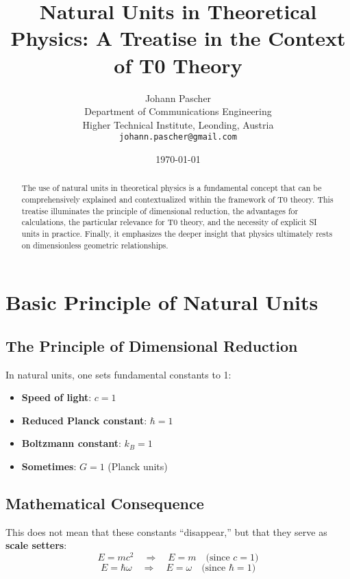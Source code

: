 \documentclass[12pt,a4paper]{article}
\title{Natural Units in Theoretical Physics: A Treatise in the Context of T0 Theory}
\author{Johann Pascher\\
	Department of Communications Engineering\\
	Higher Technical Institute, Leonding, Austria\\
	\texttt{johann.pascher@gmail.com}}
\date{\today}
\begin{document}
	
	\maketitle
	
	\begin{abstract}
		The use of natural units in theoretical physics is a fundamental concept that can be comprehensively explained and contextualized within the framework of T0 theory. This treatise illuminates the principle of dimensional reduction, the advantages for calculations, the particular relevance for T0 theory, and the necessity of explicit SI units in practice. Finally, it emphasizes the deeper insight that physics ultimately rests on dimensionless geometric relationships.
	\end{abstract}
	
	\tableofcontents
	
	\section{Basic Principle of Natural Units}
	\label{sec:grundprinzip}
	
	\subsection{The Principle of Dimensional Reduction}
	In natural units, one sets fundamental constants to 1:
	\begin{itemize}
		\item \textbf{Speed of light}: $c = 1$
		\item \textbf{Reduced Planck constant}: $\hbar = 1$
		\item \textbf{Boltzmann constant}: $k_B = 1$
		\item \textbf{Sometimes}: $G = 1$ (Planck units)
	\end{itemize}
	
	\subsection{Mathematical Consequence}
	This does not mean that these constants ``disappear,'' but that they serve as \textbf{scale setters}:
	\begin{equation}
		E = m c^2 \quad \Rightarrow \quad E = m \quad \text{(since $c=1$)}
	\end{equation}
	\begin{equation}
		E = \hbar \omega \quad \Rightarrow \quad E = \omega \quad \text{(since $\hbar=1$)}
	\end{equation}
	
\end{document}

